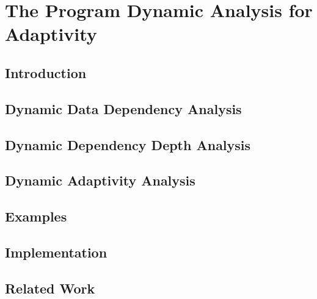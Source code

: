 \chapter{The Program Dynamic Analysis for Adaptivity}
\label{ch:dynamic}

\section{Introduction}
\label{sec:dynamic-intro}
% 

\section{Dynamic Data Dependency Analysis}
\label{sec:dynamic-datadep}
%
\section{Dynamic Dependency Depth Analysis}
\label{sec:dynamic-reachability}
%
\section{Dynamic Adaptivity Analysis}
\label{sec:dynamic-dynamic}
%
\section{Examples}
\label{sec:dynamic-examples}
% 
%
\section{Implementation}
\label{sec:dynamic-implementation}
%
\section{Related Work}
\label{sec:dynamic-relatedwork}
% 
